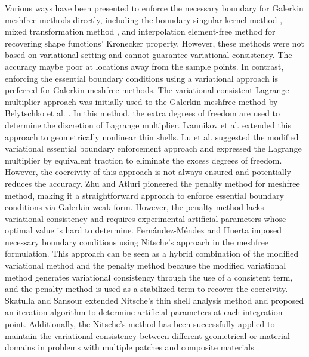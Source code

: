 Various ways have been presented to enforce the necessary boundary for Galerkin meshfree methods directly, including the boundary singular kernel method \cite{chen2000a}, mixed transformation method  \cite{chen2000a}, and interpolation element-free method \cite{liu2019a} for recovering shape functions’ Kronecker property. However, these methods were not based on variational setting and cannot guarantee variational consistency. The accuracy maybe poor at locations away from the sample points. In contrast, enforcing the essential boundary conditions using a variational approach is preferred for Galerkin meshfree methods. The variational consistent Lagrange multiplier approach was initially used to the Galerkin meshfree method by Belytschko et al. \cite{belytschko1994}. In this method, the extra degrees of freedom are used to determine the discretion of Lagrange multiplier. Ivannikov et al. \cite{ivannikov2014a} extended this approach to geometrically nonlinear thin shells. Lu et al. \cite{lu1994} suggested the modified variational essential boundary enforcement approach and expressed the Lagrange multiplier by equivalent traction to eliminate the excess degrees of freedom. However, the coercivity of this approach is not always ensured and potentially reduces the accuracy. Zhu and Atluri \cite{zhu1998} pioneered the penalty method for meshfree method, making it a straightforward approach to enforce essential boundary conditions via Galerkin weak form. However, the penalty method lacks variational consistency and requires experimental artificial parameters whose optimal value is hard to determine. Fernández-Méndez and Huerta \cite{fernandez-mendez2004} imposed necessary boundary conditions using Nitsche's approach in the meshfree formulation. This approach can be seen as a hybrid combination of the modified variational method and the penalty method because the modified variational method generates variational consistency through the use of a consistent term, and the penalty method is used as a stabilized term to recover the coercivity. Skatulla and Sansour \cite{skatulla2008} extended Nitsche’s thin shell analysis method and proposed an iteration algorithm to determine artificial parameters at each integration point.
Additionally, the Nitsche's method has been successfully applied to maintain the variational consistency between different geometrical or material domains in problems with multiple patches \cite{guo2021} and composite materials \cite{wang2021b}.

